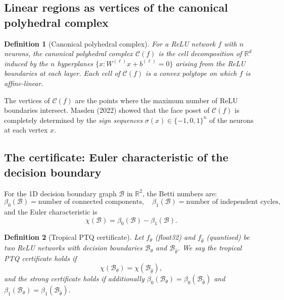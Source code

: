\documentclass[11pt]{article}
\newtheorem{definition}{Definition}
\newcommand{\R}{\mathbb{R}}
\newcommand{\C}{\mathcal{C}}
\begin{document}
\subsection{Linear regions as vertices of the canonical polyhedral complex}

\begin{definition}[Canonical polyhedral complex]
For a ReLU network $f$ with $n$ neurons, the \emph{canonical polyhedral complex}
$\C(f)$ is the cell decomposition of $\R^d$ induced by the $n$ hyperplanes
$\{x : W^{(\ell)} x + b^{(\ell)} = 0\}$ arising from the ReLU boundaries at each layer.
Each cell of $\C(f)$ is a convex polytope on which $f$ is affine-linear.
\end{definition}

The vertices of $\C(f)$ are the points where the maximum number of ReLU boundaries
intersect. Masden (2022) showed that the face poset of $\C(f)$ is completely
determined by the \emph{sign sequences} $\sigma(x) \in \{-1, 0, 1\}^n$ of the neurons
at each vertex $x$.

\subsection{The certificate: Euler characteristic of the decision boundary}

For the 1D decision boundary graph $\mathcal{B}$ in $\R^2$, the Betti numbers are:
\begin{equation}
\beta_0(\mathcal{B}) = \text{number of connected components},\quad
\beta_1(\mathcal{B}) = \text{number of independent cycles},
\end{equation}
and the Euler characteristic is
\begin{equation}
\chi(\mathcal{B}) = \beta_0(\mathcal{B}) - \beta_1(\mathcal{B}).
\label{eq:euler}
\end{equation}

\begin{definition}[Tropical PTQ certificate]
Let $f_\theta$ (float32) and $f_{\hat\theta}$ (quantised) be two ReLU networks with
decision boundaries $\mathcal{B}_\theta$ and $\mathcal{B}_{\hat\theta}$. We say the
\emph{tropical PTQ certificate holds} if
\begin{equation}
\chi(\mathcal{B}_\theta) = \chi(\mathcal{B}_{\hat\theta}),
\label{eq:certificate}
\end{equation}
and the \emph{strong certificate holds} if additionally
$\beta_0(\mathcal{B}_\theta) = \beta_0(\mathcal{B}_{\hat\theta})$
and $\beta_1(\mathcal{B}_\theta) = \beta_1(\mathcal{B}_{\hat\theta})$.
\end{definition}
\end{document}
